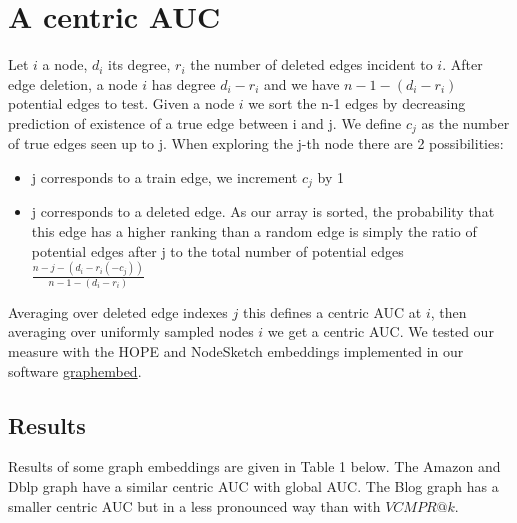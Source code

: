 \documentclass{article}
\begin{document}
\section{A centric AUC}

Let $i$ a node, $d_{i}$ its degree, $r_{i}$ the number of deleted edges incident to $i$.
After edge deletion, a node $i$ has degree $d_{i} - r_{i}$ and we have  $ n - 1 - (d_{i} - r_{i})$  potential edges to test.
Given a node $i$ we sort the n-1 edges by decreasing prediction of existence of a true edge between i and j. We define $c_{j}$  as the number of true edges seen up to j.
When exploring the j-th node there are 2 possibilities:
\begin{itemize}
    \item j corresponds to a train edge, we increment $c_{j}$ by 1
    \item j corresponds to a deleted edge. As our array is sorted, the probability that this edge has a higher
          ranking than a random edge is simply the ratio of potential edges after j to
          the total number of potential edges $ \frac{n-j-(d_{i}-r_{i}(-c_{j}))}{n-1-(d_{i}-r_{i})}$
\end{itemize}
Averaging over deleted edge indexes $j$ this defines a centric AUC at  $i$, then averaging over uniformly sampled nodes $i$ we get a centric AUC.
We tested our measure with the HOPE \citep{Ou2016asymmetric} and NodeSketch \citep{Yang2019nodesketch} embeddings implemented
in our software \href{https://github.com/jean-pierreBoth/graphembed}{\color{blue}graphembed}.

\subsection{Results}

Results of some graph embeddings are given in Table 1 below.
The Amazon and Dblp graph have a similar centric AUC with global AUC. The Blog graph has a smaller centric AUC but in a less pronounced way than with \textit{$VCMPR@k$}.\\
\end{document}

